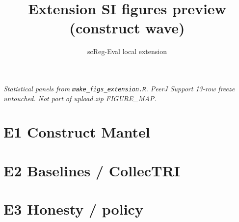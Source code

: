 \documentclass[11pt]{article}
\title{Extension SI figures preview (construct wave)}
\author{scReg-Eval local extension}
\date{}
\begin{document}
\maketitle
\noindent\textit{Statistical panels from \texttt{make\_figs\_extension.R}.
PeerJ Support 13-row freeze untouched. Not part of upload.zip FIGURE\_MAP.}

\section*{E1 Construct Mantel}
\begin{center}
\resizebox{\linewidth}{!}{}
\end{center}

\section*{E2 Baselines / CollecTRI}
\begin{center}
\resizebox{\linewidth}{!}{}
\end{center}

\section*{E3 Honesty / policy}
\begin{center}
\resizebox{\linewidth}{!}{}
\end{center}
\end{document}

